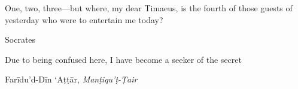 \epigraph{One, two, three---but where, my dear Timaeus, is the fourth of those guests of yesterday who were to entertain me today?}{Socrates}
\epigraph{Due to being confused here, I have become a seeker of the secret}{Farīdu'd-Dīn `Aṭṭār, \emph{Manṭiqu'ṭ-Ṭair}}